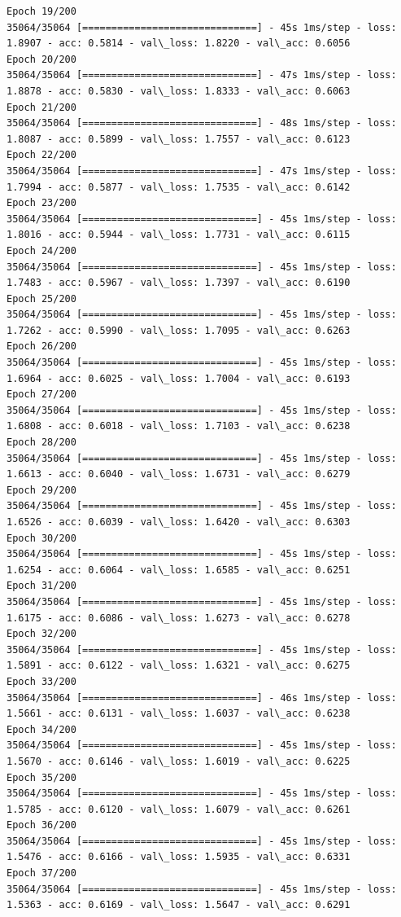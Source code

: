 \documentclass[11pt]{article}
\begin{document}
\begin{Verbatim}[commandchars=\\\{\}]
Epoch 19/200
35064/35064 [==============================] - 45s 1ms/step - loss: 1.8907 - acc: 0.5814 - val\_loss: 1.8220 - val\_acc: 0.6056
Epoch 20/200
35064/35064 [==============================] - 47s 1ms/step - loss: 1.8878 - acc: 0.5830 - val\_loss: 1.8333 - val\_acc: 0.6063
Epoch 21/200
35064/35064 [==============================] - 48s 1ms/step - loss: 1.8087 - acc: 0.5899 - val\_loss: 1.7557 - val\_acc: 0.6123
Epoch 22/200
35064/35064 [==============================] - 47s 1ms/step - loss: 1.7994 - acc: 0.5877 - val\_loss: 1.7535 - val\_acc: 0.6142
Epoch 23/200
35064/35064 [==============================] - 45s 1ms/step - loss: 1.8016 - acc: 0.5944 - val\_loss: 1.7731 - val\_acc: 0.6115
Epoch 24/200
35064/35064 [==============================] - 45s 1ms/step - loss: 1.7483 - acc: 0.5967 - val\_loss: 1.7397 - val\_acc: 0.6190
Epoch 25/200
35064/35064 [==============================] - 45s 1ms/step - loss: 1.7262 - acc: 0.5990 - val\_loss: 1.7095 - val\_acc: 0.6263
Epoch 26/200
35064/35064 [==============================] - 45s 1ms/step - loss: 1.6964 - acc: 0.6025 - val\_loss: 1.7004 - val\_acc: 0.6193
Epoch 27/200
35064/35064 [==============================] - 45s 1ms/step - loss: 1.6808 - acc: 0.6018 - val\_loss: 1.7103 - val\_acc: 0.6238
Epoch 28/200
35064/35064 [==============================] - 45s 1ms/step - loss: 1.6613 - acc: 0.6040 - val\_loss: 1.6731 - val\_acc: 0.6279
Epoch 29/200
35064/35064 [==============================] - 45s 1ms/step - loss: 1.6526 - acc: 0.6039 - val\_loss: 1.6420 - val\_acc: 0.6303
Epoch 30/200
35064/35064 [==============================] - 45s 1ms/step - loss: 1.6254 - acc: 0.6064 - val\_loss: 1.6585 - val\_acc: 0.6251
Epoch 31/200
35064/35064 [==============================] - 45s 1ms/step - loss: 1.6175 - acc: 0.6086 - val\_loss: 1.6273 - val\_acc: 0.6278
Epoch 32/200
35064/35064 [==============================] - 45s 1ms/step - loss: 1.5891 - acc: 0.6122 - val\_loss: 1.6321 - val\_acc: 0.6275
Epoch 33/200
35064/35064 [==============================] - 46s 1ms/step - loss: 1.5661 - acc: 0.6131 - val\_loss: 1.6037 - val\_acc: 0.6238
Epoch 34/200
35064/35064 [==============================] - 45s 1ms/step - loss: 1.5670 - acc: 0.6146 - val\_loss: 1.6019 - val\_acc: 0.6225
Epoch 35/200
35064/35064 [==============================] - 45s 1ms/step - loss: 1.5785 - acc: 0.6120 - val\_loss: 1.6079 - val\_acc: 0.6261
Epoch 36/200
35064/35064 [==============================] - 45s 1ms/step - loss: 1.5476 - acc: 0.6166 - val\_loss: 1.5935 - val\_acc: 0.6331
Epoch 37/200
35064/35064 [==============================] - 45s 1ms/step - loss: 1.5363 - acc: 0.6169 - val\_loss: 1.5647 - val\_acc: 0.6291

\end{Verbatim}
\end{document}
